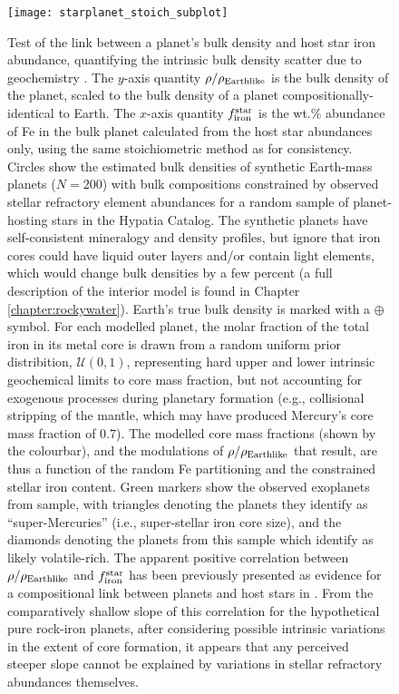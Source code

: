 \begin{figure}
  \centering
  \texttt{[image: starplanet\_stoich\_subplot]}
\caption[Test of the link between a planet's bulk density and host star iron abundance, quantifying the intrinsic bulk density scatter due to geochemistry.]{Test of the link between a planet's bulk density and host star iron abundance, quantifying the intrinsic bulk density scatter due to geochemistry \citep[cf.][Fig. 2]{adibekyan_compositional_2021}. The $y$-axis quantity $\rho / \rho_{\rm Earthlike}$ is the bulk density of the planet, scaled to the bulk density of a planet compositionally-identical to Earth. The $x$-axis quantity $f_{\rm iron}^{\rm star}$ is the wt.\% abundance of Fe in the bulk planet calculated from the host star abundances only, using the same stoichiometric method as \citet{adibekyan_compositional_2021} for consistency. Circles show the estimated bulk densities of synthetic Earth-mass planets ($N = 200$) with bulk compositions constrained by observed stellar refractory element abundances for a random sample of planet-hosting stars in the Hypatia Catalog. The synthetic planets have self-consistent mineralogy and density profiles, but ignore that iron cores could have liquid outer layers and/or contain light elements, which would change bulk densities by a few percent (a full description of the interior model is found in Chapter \ref{chapter:rockywater}). Earth's true bulk density is marked with a $\oplus$ symbol. For each modelled planet, the molar fraction of the total iron in its metal core is drawn from a random uniform prior distribition, $\mathcal{U}(0, 1)$, representing hard upper and lower intrinsic geochemical limits to core mass fraction, but not accounting for exogenous processes during planetary formation (e.g., collisional stripping of the mantle, which may have produced Mercury's core mass fraction of 0.7). The modelled core mass fractions (shown by the colourbar), and the modulations of $\rho / \rho_{\rm Earthlike}$ that result, are thus a function of the random Fe partitioning and the constrained stellar iron content. Green markers show the observed exoplanets from \citet{adibekyan_compositional_2021} sample, with triangles denoting the planets they identify as ``super-Mercuries'' (i.e., super-stellar iron core size), and the diamonds denoting the planets from this sample which \citet{unterborn_nominal_2023} identify as likely volatile-rich. The apparent positive correlation between $\rho / \rho_{\rm Earthlike}$ and $f_{\rm iron}^{\rm star}$ has been previously presented as evidence for a compositional link between planets and host stars in \citet{adibekyan_compositional_2021}. From the comparatively shallow slope of this correlation for the hypothetical pure rock-iron planets, after considering possible intrinsic variations in the extent of core formation, it appears that any perceived steeper slope cannot be explained by variations in stellar refractory abundances themselves.}
\label{fig:compositional-link} 
\end{figure}
